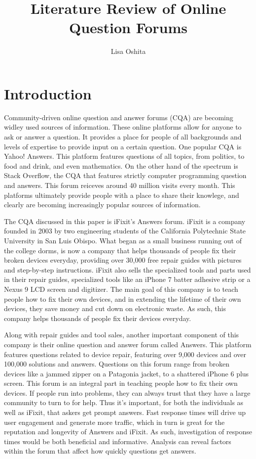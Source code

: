 \documentclass[12pt]{article}
\title{Literature Review of Online Question Forums}
\author{Lisa Oshita}
\date{}
\begin{document}
\maketitle

\section{Introduction}

    Community-driven online question and answer forums (CQA) are becoming widley used sources of information. These online platforms allow for anyone to ask or answer a question. It provides a place for people of all backgrounds and levels of expertise to provide input on a certain question. One popular CQA is Yahoo! Answers. This platform features questions of all topics, from politics, to food and drink, and even mathematics. On the other hand of the spectrum is Stack Overflow, the CQA that features strictly computer programming question and answers. This forum reiceves around 40 million visits every month. This platforms ultimately provide people with a place to share their knowlege, and clearly are becoming increasingly popular sources of information. 
    
    The CQA discussed in this paper is iFixit's Answers forum. iFixit is a company founded in 2003 by two engineering students of the California Polytechnic State University in San Luis Obispo. What began as a small business running out of the college dorms, is now a company that helps thousands of people fix their broken devices everyday, providing over 30,000 free repair guides with pictures and step-by-step instructions. iFixit also sells the specialized tools and parts used in their repair guides, specialized tools like an iPhone 7 batter adhesive strip or a Nexus 9 LCD screen and digitizer. The main goal of this company is to teach people how to fix their own devices, and in extending the lifetime of their own devices, they save money and cut down on electronic waste. As such, this company helps thousands of people fix their devices everyday. 
    
    Along with repair guides and tool sales, another important component of this company is their online question and answer forum called Answers. This platform features questions related to device repair, featuring over 9,000 devices and over 100,000 solutions and answers. Questions on this forum range from broken devices like a jammed zipper on a Patagonia jacket, to a shattered iPhone 6 plus screen. This forum is an integral part in teaching people how to fix their own devices. If people run into problems, they can always trust that they have a large community to turn to for help. Thus it's important, for both the individuals as well as iFixit, that askers get prompt answers. Fast response times will drive up user engagement and generate more traffic, which in turn is great for the reputation and longevity of Answers and iFixit. As such, investigation of response times would be both beneficial and informative. Analysis can reveal factors within the forum that affect how quickly questions get answers. 
\end{document}
